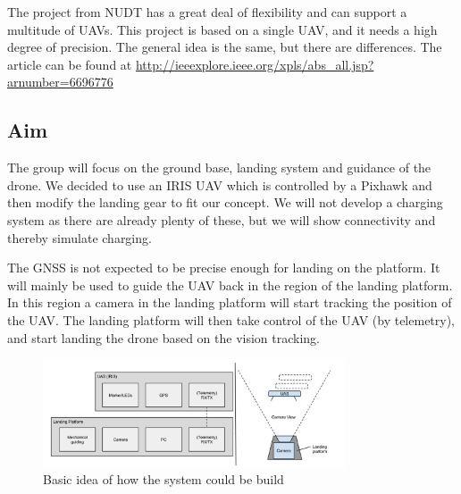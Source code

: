 The project from NUDT has a great deal of flexibility and can support a multitude of UAVs. This project is based on a single UAV, and it needs a high degree of precision. The general idea is the same, but there are differences. The article can be found at \url{http://ieeexplore.ieee.org/xpls/abs_all.jsp?arnumber=6696776}

\subsection{Aim}
The group will focus on the ground base, landing system and guidance of the drone. We decided to use an IRIS UAV which is controlled by a Pixhawk and then modify the landing gear to fit our concept. We will not develop a charging system as there are already plenty of these, but we will show connectivity and thereby simulate charging.
 
The GNSS is not expected to be precise enough for landing on the platform. It will mainly be used to guide the UAV back in the region of the landing platform. In this region a camera in the landing platform will start tracking the position of the UAV. The landing platform will then take control of the UAV (by telemetry), and start landing the drone based on the vision tracking.
\begin{figure}
	\centering
	\includegraphics[width=0.8\textwidth]{imgs/introduction}
	\caption{Basic idea of how the system could be build}
\end{figure}